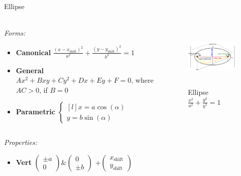 \documentclass[aspectratio=169]{beamer}
\newcommand{\shf}{\text{shift}}
\begin{document}
\begin{frame}[t]{Ellipse}
    \framesubtitle{}
        \scriptsize
        \vspace{-0.4cm}
    \begin{columns}[T,onlytextwidth]
        \begin{column}{0.59\textwidth}
            \textit{Forms:} \\
            \begin{itemize}
                \item \textbf{Canonical} $\frac{(x-x_{\shf})^2}{a^2}+\frac{(y-y_{\shf})^2}{b^2}=1$
                \item \textbf{General} $Ax^2+Bxy+Cy^2+Dx+Ey+F=0$, where $AC > 0$, if $B=0$
                \item \textbf{Parametric} $\left\{\begin{matrix*}[l] x = a\cos(\alpha)\\ y = b\sin(\alpha) \end{matrix*}\right.$
            \end{itemize}
        \end{column}
        \begin{column}{0.39\textwidth}
            \vspace{-0.5cm}
            \begin{figure}[H]
                \centering\includegraphics[height=3cm,width=1\textwidth,keepaspectratio]{Ellipse.png}
                \vspace{-0.5cm}
                \caption*{\scriptsize Ellipse $\frac{x^2}{a^2}+\frac{y^2}{b^2}=1$}
                \label{fig:Ellipse.png}
            \end{figure}
        \end{column}
    \end{columns}
    \vspace{-0.5cm}
    \textit{Properties:}
    \vspace{-0.2cm}
    \begin{multicols}{3}
        \begin{itemize}
            \item \textbf{Vert} $\begin{pmatrix} \pm a\\0 \end{pmatrix}$\&$\begin{pmatrix} 0\\\pm b \end{pmatrix}$ $ + \begin{pmatrix} x_{\shf}\\y_{\shf} \end{pmatrix}$

\end{itemize}
\end{multicols}
\end{frame}
\end{document}
